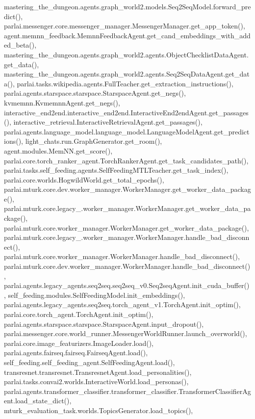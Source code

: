 mastering\+\_\+the\+\_\+dungeon.\+agents.\+graph\+\_\+world2.\+models.\+Seq2\+Seq\+Model.\+forward\+\_\+predict(), parlai.\+messenger.\+core.\+messenger\+\_\+manager.\+Messenger\+Manager.\+get\+\_\+app\+\_\+token(), agent.\+memnn\+\_\+feedback.\+Memnn\+Feedback\+Agent.\+get\+\_\+cand\+\_\+embeddings\+\_\+with\+\_\+added\+\_\+beta(), mastering\+\_\+the\+\_\+dungeon.\+agents.\+graph\+\_\+world2.\+agents.\+Object\+Checklist\+Data\+Agent.\+get\+\_\+data(), mastering\+\_\+the\+\_\+dungeon.\+agents.\+graph\+\_\+world2.\+agents.\+Seq2\+Seq\+Data\+Agent.\+get\+\_\+data(), parlai.\+tasks.\+wikipedia.\+agents.\+Full\+Teacher.\+get\+\_\+extraction\+\_\+instructions(), parlai.\+agents.\+starspace.\+starspace.\+Starspace\+Agent.\+get\+\_\+negs(), kvmemnn.\+Kvmemnn\+Agent.\+get\+\_\+negs(), interactive\+\_\+end2end.\+interactive\+\_\+end2end.\+Interactive\+End2end\+Agent.\+get\+\_\+passages(), interactive\+\_\+retrieval.\+Interactive\+Retrieval\+Agent.\+get\+\_\+passages(), parlai.\+agents.\+language\+\_\+model.\+language\+\_\+model.\+Language\+Model\+Agent.\+get\+\_\+predictions(), light\+\_\+chats.\+run.\+Graph\+Generator.\+get\+\_\+room(), agent.\+modules.\+Mem\+N\+N.\+get\+\_\+score(), parlai.\+core.\+torch\+\_\+ranker\+\_\+agent.\+Torch\+Ranker\+Agent.\+get\+\_\+task\+\_\+candidates\+\_\+path(), parlai.\+tasks.\+self\+\_\+feeding.\+agents.\+Self\+Feeding\+M\+T\+L\+Teacher.\+get\+\_\+task\+\_\+index(), parlai.\+core.\+worlds.\+Hogwild\+World.\+get\+\_\+total\+\_\+epochs(), parlai.\+mturk.\+core.\+dev.\+worker\+\_\+manager.\+Worker\+Manager.\+get\+\_\+worker\+\_\+data\+\_\+package(), parlai.\+mturk.\+core.\+legacy\+\_.\+worker\+\_\+manager.\+Worker\+Manager.\+get\+\_\+worker\+\_\+data\+\_\+package(), parlai.\+mturk.\+core.\+worker\+\_\+manager.\+Worker\+Manager.\+get\+\_\+worker\+\_\+data\+\_\+package(), parlai.\+mturk.\+core.\+legacy\+\_.\+worker\+\_\+manager.\+Worker\+Manager.\+handle\+\_\+bad\+\_\+disconnect(), parlai.\+mturk.\+core.\+worker\+\_\+manager.\+Worker\+Manager.\+handle\+\_\+bad\+\_\+disconnect(), parlai.\+mturk.\+core.\+dev.\+worker\+\_\+manager.\+Worker\+Manager.\+handle\+\_\+bad\+\_\+disconnect(), parlai.\+agents.\+legacy\+\_\+agents.\+seq2seq.\+seq2seq\+\_\+v0.\+Seq2seq\+Agent.\+init\+\_\+cuda\+\_\+buffer(), self\+\_\+feeding.\+modules.\+Self\+Feeding\+Model.\+init\+\_\+embeddings(), parlai.\+agents.\+legacy\+\_\+agents.\+seq2seq.\+torch\+\_\+agent\+\_\+v1.\+Torch\+Agent.\+init\+\_\+optim(), parlai.\+core.\+torch\+\_\+agent.\+Torch\+Agent.\+init\+\_\+optim(), parlai.\+agents.\+starspace.\+starspace.\+Starspace\+Agent.\+input\+\_\+dropout(), parlai.\+messenger.\+core.\+world\+\_\+runner.\+Messenger\+World\+Runner.\+launch\+\_\+overworld(), parlai.\+core.\+image\+\_\+featurizers.\+Image\+Loader.\+load(), parlai.\+agents.\+fairseq.\+fairseq.\+Fairseq\+Agent.\+load(), self\+\_\+feeding.\+self\+\_\+feeding\+\_\+agent.\+Self\+Feeding\+Agent.\+load(), transresnet.\+transresnet.\+Transresnet\+Agent.\+load\+\_\+personalities(), parlai.\+tasks.\+convai2.\+worlds.\+Interactive\+World.\+load\+\_\+personas(), parlai.\+agents.\+transformer\+\_\+classifier.\+transformer\+\_\+classifier.\+Transformer\+Classifier\+Agent.\+load\+\_\+state\+\_\+dict(), mturk\+\_\+evaluation\+\_\+task.\+worlds.\+Topics\+Generator.\+load\+\_\+topics(), 